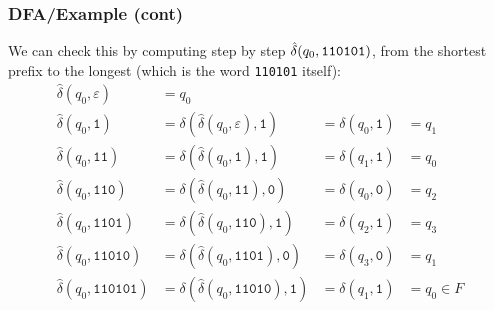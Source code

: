 % 
\begin{frame}[containsverbatim]
\frametitle{DFA/Example (cont)}

We can check this by computing step by step
\(\hat{\delta}(q_0,\verb+110101+)\), from the shortest prefix to the
longest (which is the word \verb+110101+ itself):
\begin{align*}
  \hat{\delta} (q_0, \varepsilon) 
&= q_0\\
   \hat{\delta} (q_0, \texttt{1}) 
&= \delta (\hat{\delta} (q_0, \varepsilon), \texttt{1})
&= \delta (q_0, \texttt{1})
&= q_1\\
   \hat{\delta} (q_0, \texttt{11}) 
&= \delta (\hat{\delta} (q_0, \texttt{1}), \texttt{1}) 
&= \delta (q_1, \texttt{1}) 
&= q_0\\
   \hat{\delta} (q_0, \texttt{110}) 
&= \delta (\hat{\delta} (q_0, \texttt{11}), \texttt{0}) 
&= \delta (q_0, \texttt{0}) 
&= q_2\\
   \hat{\delta} (q_0, \texttt{1101}) 
&= \delta (\hat{\delta} (q_0, \texttt{110}), \texttt{1}) 
&= \delta (q_2, \texttt{1}) 
&= q_3\\
   \hat{\delta} (q_0, \texttt{11010}) 
&= \delta (\hat{\delta} (q_0, \texttt{1101}), \texttt{0}) 
&= \delta (q_3, \texttt{0}) 
&= q_1\\
   \hat{\delta} (q_0, \texttt{110101}) 
&= \delta (\hat{\delta} (q_0, \texttt{11010}), \texttt{1}) 
&= \delta (q_1, \texttt{1}) 
&= q_0 \in F
\end{align*}

\end{frame}
